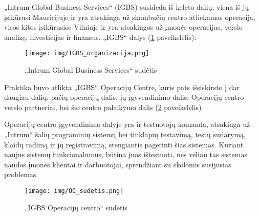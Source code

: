 \documentclass{VUMIFPSkursinis}
\begin{document}
„Intrum Global Business Services“ (IGBS) susideda iš keleto dalių, viena iš jų įsikūrusi Mauricijuje ir yra atsakinga už skambučių centro atliekamas operacija, visos kitos įsikūrusios Vilniuje ir yra atsakingos už įmonės operacijas, verslo analizę, investicijas ir finansus. „IGBS“ dalys (\ref{img:igbs} paveikslėlis):

\begin{figure}[H]
    \centering
    \texttt{[image: img/IGBS\_organizacija.png]}
    \caption{„Intrum Global Business Services“ sudėtis}
    \label{img:igbs}
\end{figure}

Praktika buvo atlikta „IGBS“ Operacijų Centre, kuris pats išsiskirsto į dar daugiau dalių: pačių operacijų dalis, jų įgyvendinimo dalis, Operacijų centro verslo partneriai, bei šio centro palaikymo dalis (\ref{img:oc} paveikslėlis)

Operacijų centro įgyvendinimo dalyje yra ir testuotojų komanda, atsakinga už „Intrum“ šalių programinių sistemų bei tinklapių testavimą, testų sudarymą, klaidų radimą ir jų registravimą, stengiantis pagerinti šias sistemas. Kuriant naujus sistemų funkcionalumus, būtina juos ištestuoti, nes vėliau tas sistemas naudos įmonės klientai ir darbuotojai, sprendžiant su skolomis susijusias problemas.

\begin{figure}[H]
    \centering
    \texttt{[image: img/OC\_sudetis.png]}
    \caption{„IGBS Operacijų centro“ sudėtis}
    \label{img:oc}
\end{figure}
\end{document}
